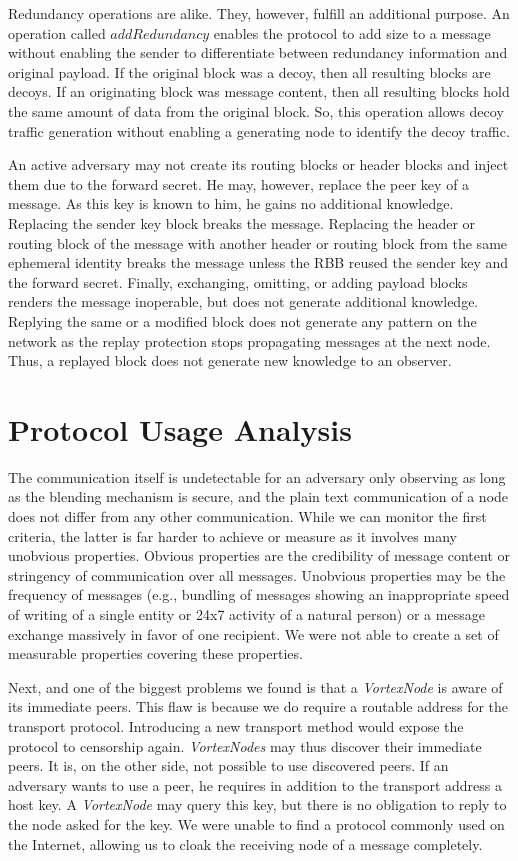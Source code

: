 \documentclass[acmsmall, screen, final, natbib=false]{acmart}
\begin{document}
	Redundancy operations are alike. They, however, fulfill an additional purpose. An operation called $addRedundancy$ enables the protocol to add size to a message without enabling the sender to differentiate between redundancy information and original payload. If the original block was a decoy, then all resulting blocks are decoys. If an originating block was message content, then all resulting blocks hold the same amount of data from the original block. So, this operation allows decoy traffic generation without enabling a generating node to identify the decoy traffic.
	
	An active adversary may not create its routing blocks or header blocks and inject them due to the forward secret. He may, however, replace the peer key of a message. As this key is known to him, he gains no additional knowledge. Replacing the sender key block breaks the message. Replacing the header or routing block of the message with another header or routing block from the same ephemeral identity breaks the message unless the RBB reused the sender key and the forward secret. Finally, exchanging, omitting, or adding payload blocks renders the message inoperable, but does not generate additional knowledge. Replying the same or a modified block does not generate any pattern on the network as the replay protection stops propagating messages at the next node. Thus, a replayed block does not generate new knowledge to an observer.
	
	\section{Protocol Usage Analysis}
	The communication itself is undetectable for an adversary only observing as long as the blending mechanism is secure, and the plain text communication of a node does not differ from any other communication. While we can monitor the first criteria, the latter is far harder to achieve or measure as it involves many unobvious properties. Obvious properties are the credibility of message content or stringency of communication over all messages. Unobvious properties may be the frequency of messages (e.g., bundling of messages showing an inappropriate speed of writing of a single entity or 24x7 activity of a natural person) or a message exchange massively in favor of one recipient. We were not able to create a set of measurable properties covering these properties.
	
	Next, and one of the biggest problems we found is that a \emph{VortexNode} is aware of its immediate peers. This flaw is because we do require a routable address for the transport protocol. Introducing a new transport method would expose the protocol to censorship again. \emph{VortexNodes} may thus discover their immediate peers. It is, on the other side, not possible to use discovered peers. If an adversary wants to use a peer, he requires in addition to the transport address a host key. A \emph{VortexNode} may query this key, but there is no obligation to reply to the node asked for the key. We were unable to find a protocol commonly used on the Internet, allowing us to cloak the receiving node of a message completely.
	
\end{document}

